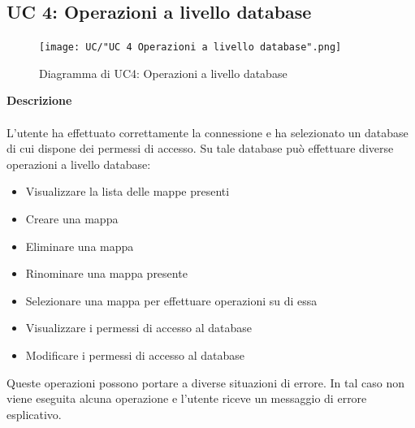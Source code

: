 \documentclass[a4paper]{article}
\begin{document}
		 
		 
		 \subsection{UC 4: Operazioni a livello database}
	 \begin{figure}[H]
				\centering
				\texttt{[image: UC/"UC 4 Operazioni a livello database".png]}
				\caption{Diagramma di UC4: Operazioni a livello database}
			\end{figure}
	\textbf{Descrizione} 
	\\ \\
	L'utente ha effettuato correttamente la connessione e ha selezionato un database di cui dispone dei permessi di accesso. Su tale database può effettuare diverse operazioni a livello database:
	\begin{itemize}
	\item Visualizzare la lista delle mappe presenti
	\item Creare una mappa
	\item Eliminare una mappa
	\item Rinominare una mappa presente
	\item Selezionare una mappa per effettuare operazioni su di essa
	\item Visualizzare i permessi di accesso al database
	\item Modificare i permessi di accesso al database
	\end{itemize}
	Queste operazioni possono portare a diverse situazioni di errore. In tal caso non viene eseguita alcuna operazione e l'utente riceve un messaggio di errore esplicativo. 
\end{document}
